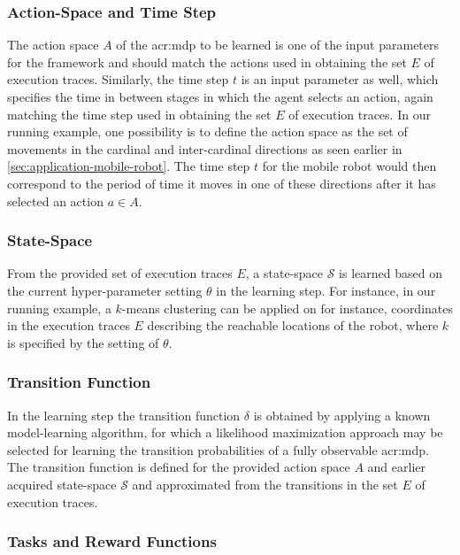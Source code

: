 \subsubsection{Action-Space and Time Step}
The action space $A$ of the \acrshort{acr:mdp} to be learned is one of the input parameters for the framework and should match the actions used in obtaining the set $E$ of execution traces.
Similarly, the time step $t$ is an input parameter as well, which specifies the time in between stages in which the agent selects an action, again matching the time step used in obtaining the set $E$ of execution traces.
In our running example, one possibility is to define the action space as the set of movements in the cardinal and inter-cardinal directions as seen earlier in \autoref{sec:application-mobile-robot}.
The time step $t$ for the mobile robot would then correspond to the period of time it moves in one of these directions after it has selected an action $a \in A$.

\subsubsection{State-Space}
From the provided set of execution traces $E$, a state-space $\mathcal{S}$ is learned based on the current hyper-parameter setting $\theta$ in the learning step.
For instance, in our running example, a $k$-means clustering can be applied on for instance, coordinates in the execution traces $E$ describing the reachable locations of the robot, where $k$ is specified by the setting of $\theta$.

\subsubsection{Transition Function}
In the learning step the transition function $\delta$ is obtained by applying a known model-learning algorithm, for which a likelihood maximization approach may be selected for learning the transition probabilities of a fully observable \acrshort{acr:mdp}.
The transition function is defined for the provided action space $A$ and earlier acquired state-space $\mathcal{S}$ and approximated from the transitions in the set $E$ of execution traces.

\subsubsection{Tasks and Reward Functions}

